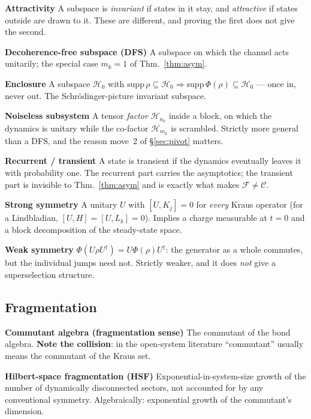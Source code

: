 \documentclass[11pt]{article}
\newcommand{\C}{\mathcal{C}}
\newcommand{\F}{\mathcal{F}}
\newcommand{\HH}{\mathcal{H}}
\newcommand{\term}[1]{\medskip\noindent\textbf{#1}\quad}
\theoremstyle{plain}
\theoremstyle{remark}
\begin{document}
\term{Attractivity} A subspace is \emph{invariant} if states in it stay, and
\emph{attractive} if states outside are drawn to it. These are different, and
proving the first does not give the second. \cite{TV2008}

\term{Decoherence-free subspace (DFS)} A subspace on which the channel acts
unitarily; the special case $m_k = 1$ of Thm.~\ref{thm:asym}.
\cite{ZR1997, LCW1998, LW2003}

\term{Enclosure} A subspace $\HH_0$ with
$\mathrm{supp}\,\rho \subseteq \HH_0 \Rightarrow
\mathrm{supp}\,\Phi(\rho) \subseteq \HH_0$ --- once in, never out. The
Schr\"odinger-picture invariant subspace. \cite{BN2008}

\term{Noiseless subsystem} A tensor \emph{factor} $\HH_{n_k}$ inside a block,
on which the dynamics is unitary while the co-factor $\HH_{m_k}$ is scrambled.
Strictly more general than a DFS, and the reason move~2 of \S\ref{sec:pivot}
matters. \cite{KLV2000, LW2003, KLP2005}

\term{Recurrent / transient} A state is transient if the dynamics eventually
leaves it with probability one. The recurrent part carries the asymptotics; the
transient part is invisible to Thm.~\ref{thm:asym} and is exactly what makes
$\F \ne \C$. \cite{CP2016}

\term{Strong symmetry} A unitary $U$ with $[U, K_j] = 0$ for \emph{every} Kraus
operator (for a Lindbladian, $[U,H] = [U,L_k] = 0$). Implies a charge
measurable at $t = 0$ and a block decomposition of the steady-state space.
\cite{Buca2012, AJ2014}

\term{Weak symmetry} $\Phi(U\rho U^\dagger) = U\Phi(\rho)U^\dagger$: the
generator as a whole commutes, but the individual jumps need not. Strictly
weaker, and it does \emph{not} give a superselection structure.
\cite{Buca2012, Lieu2020}

\subsection{Fragmentation}

\term{Commutant algebra (fragmentation sense)} The commutant of the bond
algebra. \textbf{Note the collision}: in the open-system literature
``commutant'' usually means the commutant of the Kraus set. \cite{MM2022}

\term{Hilbert-space fragmentation (HSF)} Exponential-in-system-size growth of
the number of dynamically disconnected sectors, not accounted for by any
conventional symmetry. Algebraically: exponential growth of the commutant's
dimension. \cite{Sala2020, Khemani2020, MM2022, MBR2022}
\end{document}
